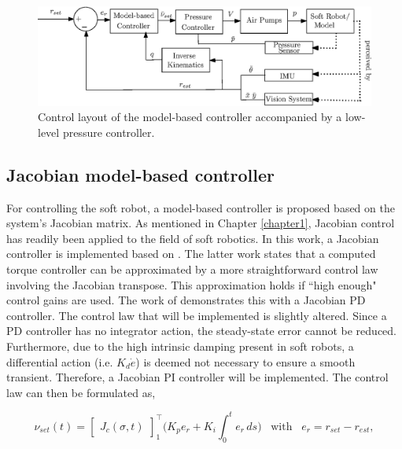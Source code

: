 \begin{figure}[H]
    \centering
    \includegraphics[width = \textwidth]{Figures/Chapter4/ControlschemeActualwithPump.eps}
    \caption{Control layout of the model-based controller accompanied by a low-level pressure controller.}
    \label{fig4:controllayout}
\end{figure}


\subsection{Jacobian model-based controller}


For controlling the soft robot, a model-based controller is proposed based on the system's Jacobian matrix. As mentioned in Chapter \ref{chapter1}, Jacobian control has readily been applied to the field of soft robotics. In this work, a Jacobian controller is implemented based on \cite{MOOSAVIAN20071226}. The latter work states that a computed torque controller can be approximated by a more straightforward control law involving the Jacobian transpose. This approximation holds if ``high enough" control gains are used. The work of \cite{MOOSAVIAN20071226} demonstrates this with a Jacobian PD controller. The control law that will be implemented is slightly altered. Since a PD controller has no integrator action, the steady-state error cannot be reduced. Furthermore, due to the high intrinsic damping present in soft robots, a differential action (i.e. $K_d \dot{e}$) is deemed not necessary to ensure a smooth transient. Therefore, a Jacobian PI controller will be implemented. The control law can then be formulated as,


\begin{equation}
    \nu_{set}(t) = \begin{bmatrix}J_c(\sigma,t)\end{bmatrix}_1^\top \Big(K_p e_r + K_i \int_0^t e_r \hspace{2pt} ds \Big) \hspace{10pt} \text{with} \hspace{10pt} e_r = r_{set}-r_{est}, 
    \label{eq:tau}
\end{equation}

